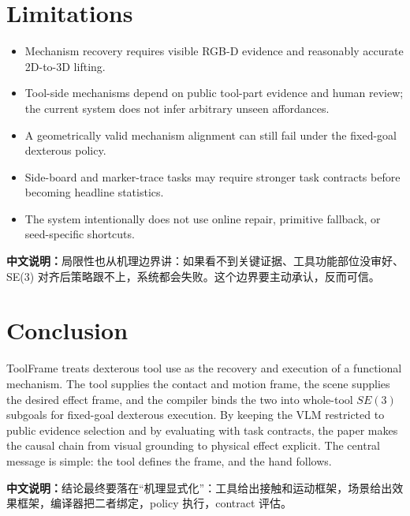 \documentclass[journal]{IEEEtran}
\newcommand{\method}{ToolFrame}
\newcommand{\cn}[1]{\par\smallskip\noindent\textbf{中文说明：}#1\par\smallskip}
\begin{document}
\section{Limitations}
\begin{itemize}
  \item Mechanism recovery requires visible RGB-D evidence and reasonably
  accurate 2D-to-3D lifting.
  \item Tool-side mechanisms depend on public tool-part evidence and human
  review; the current system does not infer arbitrary unseen affordances.
  \item A geometrically valid mechanism alignment can still fail under the
  fixed-goal dexterous policy.
  \item Side-board and marker-trace tasks may require stronger task contracts
  before becoming headline statistics.
  \item The system intentionally does not use online repair, primitive
  fallback, or seed-specific shortcuts.
\end{itemize}

\cn{局限性也从机理边界讲：如果看不到关键证据、工具功能部位没审好、SE(3) 对齐后策略跟不上，系统都会失败。这个边界要主动承认，反而可信。}

\section{Conclusion}
\method{} treats dexterous tool use as the recovery and execution of a
functional mechanism. The tool supplies the contact and motion frame, the scene
supplies the desired effect frame, and the compiler binds the two into
whole-tool $SE(3)$ subgoals for fixed-goal dexterous execution. By keeping the
VLM restricted to public evidence selection and by evaluating with task
contracts, the paper makes the causal chain from visual grounding to physical
effect explicit. The central message is simple: the tool defines the frame, and
the hand follows.

\cn{结论最终要落在“机理显式化”：工具给出接触和运动框架，场景给出效果框架，编译器把二者绑定，policy 执行，contract 评估。}



\end{document}

